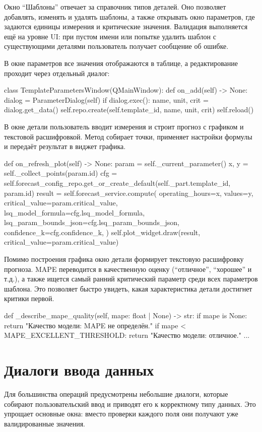 \documentclass[12pt,a4paper]{article}
\begin{document}
Окно ``Шаблоны'' отвечает за справочник типов деталей. Оно позволяет добавлять,
изменять и удалять шаблоны, а также открывать окно параметров, где задаются
единицы измерения и критические значения. Валидация выполняется ещё на уровне UI:
при пустом имени или попытке удалить шаблон с существующими деталями пользователь
получает сообщение об ошибке.

В окне параметров все значения отображаются в таблице, а редактирование проходит
через отдельный диалог:
\begin{codeblock}
class TemplateParametersWindow(QMainWindow):
    def on_add(self) -> None:
        dialog = ParameterDialog(self)
        if dialog.exec():
            name, unit, crit = dialog.get_data()
            self.repo.create(self.template_id, name, unit, crit)
            self.reload()
\end{codeblock}

В окне детали пользователь вводит измерения и строит прогноз с графиком и текстовой расшифровкой.
Метод собирает точки, применяет настройки формулы и передаёт результат в виджет графика.
\begin{codeblock}
def on_refresh_plot(self) -> None:
    param = self._current_parameter()
    x, y = self._collect_points(param.id)
    cfg = self.forecast_config_repo.get_or_create_default(self._part.template_id, param.id)
    result = self.forecast_service.compute(
        operating_hours=x,
        values=y,
        critical_value=param.critical_value,
        lsq_model_formula=cfg.lsq_model_formula,
        lsq_param_bounds_json=cfg.lsq_param_bounds_json,
        confidence_k=cfg.confidence_k,
    )
    self.plot_widget.draw(result, critical_value=param.critical_value)
\end{codeblock}

Помимо построения графика окно детали формирует текстовую расшифровку прогноза.
MAPE переводится в качественную оценку (``отличное'', ``хорошее'' и т.д.), а также
ищется самый ранний критический параметр среди всех параметров шаблона. Это позволяет
быстро увидеть, какая характеристика детали достигнет критики первой.

\begin{codeblock}
def _describe_mape_quality(self, mape: float | None) -> str:
    if mape is None:
        return "Качество модели: MAPE не определён."
    if mape < MAPE_EXCELLENT_THRESHOLD:
        return "Качество модели: отличное."
    ...
\end{codeblock}

\section*{Диалоги ввода данных}
Для большинства операций предусмотрены небольшие диалоги, которые собирают
пользовательский ввод и приводят его к корректному типу данных. Это упрощает
основные окна: вместо проверки каждого поля они получают уже валидированные
значения.
\end{document}
